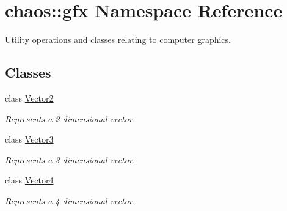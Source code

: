 \hypertarget{namespacechaos_1_1gfx}{\section{chaos\-:\-:gfx Namespace Reference}
\label{namespacechaos_1_1gfx}
}


Utility operations and classes relating to computer graphics.  


\subsection*{Classes}
\begin{DoxyCompactItemize}
\item 
class \hyperlink{classchaos_1_1gfx_1_1_vector2}{Vector2}
\begin{DoxyCompactList}\small\item\em Represents a 2 dimensional vector. \end{DoxyCompactList}\item 
class \hyperlink{classchaos_1_1gfx_1_1_vector3}{Vector3}
\begin{DoxyCompactList}\small\item\em Represents a 3 dimensional vector. \end{DoxyCompactList}\item 
class \hyperlink{classchaos_1_1gfx_1_1_vector4}{Vector4}
\begin{DoxyCompactList}\small\item\em Represents a 4 dimensional vector. \end{DoxyCompactList}\end{DoxyCompactItemize}
